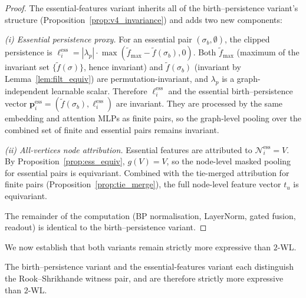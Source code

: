 \begin{proof}
The essential-features variant inherits all of the birth--persistence variant's structure (Proposition~\ref{prop:v4_invariance}) and adds two new components:

\emph{(i) Essential persistence proxy.}
For an essential pair $(\sigma_b, \emptyset)$, the clipped persistence is $\ell_i^{\mathrm{ess}} = |\lambda_p| \cdot \max(\tilde{f}_{\max} - \tilde{f}(\sigma_b), 0)$. Both $\tilde{f}_{\max}$ (maximum of the invariant set $\{\tilde{f}(\sigma)\}$, hence invariant) and $\tilde{f}(\sigma_b)$ (invariant by Lemma~\ref{lem:filt_equiv}) are permutation-invariant, and $\lambda_p$ is a graph-independent learnable scalar. Therefore $\ell_i^{\mathrm{ess}}$ and the essential birth--persistence vector $\mathbf{p}_i^{\mathrm{ess}} = (\tilde{f}(\sigma_b), \ell_i^{\mathrm{ess}})$ are invariant. They are processed by the same embedding and attention MLPs as finite pairs, so the graph-level pooling over the combined set of finite and essential pairs remains invariant.

\emph{(ii) All-vertices node attribution.}
Essential features are attributed to $\mathcal{N}_i^{\mathrm{ess}} = V$. By Proposition~\ref{prop:ess_equiv}, $g(V) = V$, so the node-level masked pooling for essential pairs is equivariant. Combined with the tie-merged attribution for finite pairs (Proposition~\ref{prop:tie_merge}), the full node-level feature vector $t_u$ is equivariant.

The remainder of the computation (BP normalisation, LayerNorm, gated fusion, readout) is identical to the birth--persistence variant.
\end{proof}

We now establish that both variants remain strictly more expressive than $2$-WL.

\begin{corollary}
\label{cor:variants_strict}
The birth--persistence variant and the essential-features variant each distinguish the Rook--Shrikhande witness pair, and are therefore strictly more expressive than $2$-WL.
\end{corollary}

